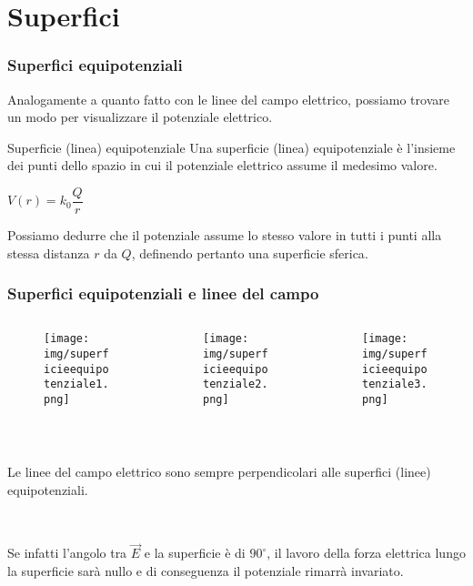 \documentclass[]{beamer}
\theoremstyle{plain}
\begin{document}
\section{Superfici}

\begin{frame}
\frametitle{Superfici equipotenziali}
Analogamente a quanto fatto con le linee del campo elettrico, possiamo trovare un modo per visualizzare il potenziale elettrico.

\begin{block}{Superficie (linea) equipotenziale}
Una superficie (linea) equipotenziale è l'insieme dei punti dello spazio in cui il potenziale elettrico assume il medesimo valore.
\end{block}\pause
\begin{center}
$ V(r) = k_0 \dfrac{Q}{r} $
\end{center}
Possiamo dedurre che il potenziale assume lo stesso valore in tutti i punti alla stessa distanza $ r $ da $ Q $, definendo pertanto una \alert{superficie sferica}.
\end{frame}




\begin{frame}
\frametitle{Superfici equipotenziali e linee del campo}
\begin{columns}
\begin{column}{0.25\textwidth}
\begin{figure}
\texttt{[image: img/superficieequipotenziale1.png]}
\end{figure}
\end{column}
\begin{column}{0.25\textwidth}
\begin{figure}
\texttt{[image: img/superficieequipotenziale2.png]}
\end{figure}
\end{column}
\begin{column}{0.5\textwidth}
\begin{figure}
\texttt{[image: img/superficieequipotenziale3.png]}
\end{figure}
\end{column}
\end{columns}\pause

~

\alert{Le linee del campo elettrico sono sempre perpendicolari alle superfici (linee) equipotenziali.}\pause

~

Se infatti l'angolo tra $ \vec{E} $ e la superficie è di $ 90^\circ $, il lavoro della forza elettrica lungo la superficie sarà nullo e di conseguenza il potenziale rimarrà invariato.
\end{frame}
\end{document}
